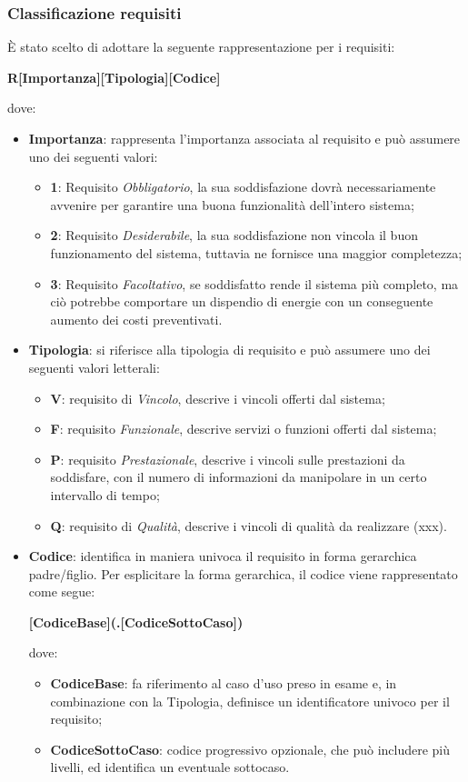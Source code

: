 \subsubsection{Classificazione requisiti}
È stato scelto di adottare la seguente rappresentazione per i requisiti:

\begin{center}
\textbf{R[Importanza][Tipologia][Codice]}
\end{center}
dove:
\begin{itemize}
\item \textbf{Importanza}: rappresenta l’importanza associata al requisito e può assumere uno dei seguenti valori:
\begin{itemize}
	\item \textbf{1}: Requisito \textit{Obbligatorio}, la sua soddisfazione dovrà necessariamente avvenire per garantire una buona funzionalità dell’intero sistema;
	\item \textbf{2}: Requisito \textit{Desiderabile}, la sua soddisfazione non vincola il buon funzionamento del sistema, tuttavia ne fornisce una maggior completezza;
	\item \textbf{3}: Requisito \textit{Facoltativo}, se soddisfatto rende il sistema più completo, ma ciò potrebbe comportare un dispendio di energie con un conseguente aumento dei costi preventivati.
\end{itemize}
\item \textbf{Tipologia}: si riferisce alla tipologia di requisito e può assumere uno dei seguenti valori letterali:
\begin{itemize}
	\item \textbf{V}: requisito di \textit{Vincolo}, descrive i vincoli offerti dal sistema;
	\item \textbf{F}: requisito \textit{Funzionale}, descrive servizi o funzioni offerti dal sistema;
	\item \textbf{P}: requisito \textit{Prestazionale}, descrive i vincoli sulle prestazioni da soddisfare, con il numero di informazioni da manipolare in un certo intervallo di tempo;
	\item \textbf{Q}: requisito di \textit{Qualità}, descrive i vincoli di qualità da realizzare (xxx).
\end{itemize}
\item \textbf{Codice}: identifica in maniera univoca il requisito in forma gerarchica padre/figlio.
Per esplicitare la forma gerarchica, il codice viene rappresentato come segue:
\begin{center}
\textbf{[CodiceBase](.[CodiceSottoCaso])}
\end{center}
dove: 
\begin{itemize}
	\item \textbf{CodiceBase}: fa riferimento al caso d’uso preso in esame e, in combinazione con la Tipologia, definisce un identificatore univoco per il requisito;
	\item \textbf{CodiceSottoCaso}: codice progressivo opzionale, che può includere più livelli, ed identifica un eventuale sottocaso.
\end{itemize}
\end{itemize}

